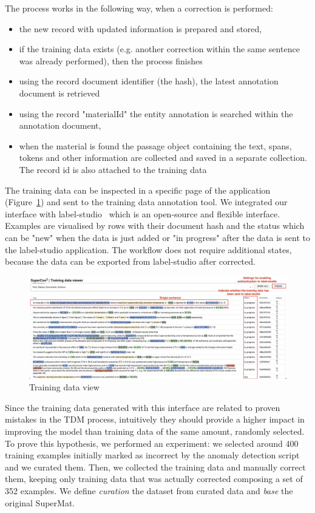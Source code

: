 \documentclass[a4paper]{article}
\begin{document}
The process works in the following way, when a correction is performed:
\begin{itemize}
    \item the new record with updated information is prepared and stored, 
    \item if the training data exists (e.g. another correction within the same sentence was already performed), then the process finishes
    \item using the record document identifier (the hash), the latest annotation document is retrieved
    \item using the record "materialId" the entity annotation is searched within the annotation document,
    \item when the material is found the passage object containing the text, spans, tokens and other information are collected and saved in a separate collection. The record id is also attached to the training data 
\end{itemize}

The training data can be inspected in a specific page of the application (Figure~\ref{fig:training-data-view}) and sent to the training data annotation tool. We integrated our interface with label-studio~\cite{Label_Studio} which is an open-source and flexible interface. 
Examples are visualised by rows with their document hash and the status which can be "new" when the data is just added or "in progress" after the data is sent to the label-studio application. 
The workflow does not require additional states, because the data can be exported from label-studio after corrected. 


\begin{figure}[ht]
  \centering
  \includegraphics[width=1\textwidth]{images/training-data-viewer} 
  \caption{Training data view}
  \label{fig:training-data-view}
\end{figure}

Since the training data generated with this interface are related to proven mistakes in the TDM process, intuitively they should provide a higher impact in improving the model than training data of the same amount, randomly selected.
To prove this hypothesis, we performed an experiment: we selected around 400 training examples initially marked as incorrect by the anomaly detection script and we curated them. 
Then, we collected the training data and manually correct them, keeping only training data that was actually corrected composing a set of 352 examples. We define \textit{curation} the dataset from curated data and \textit{base} the original SuperMat.
\end{document}
